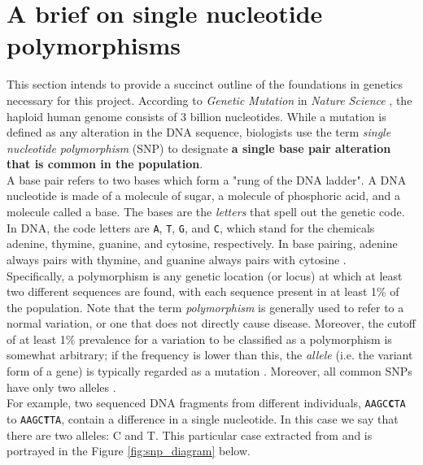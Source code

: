 \documentclass[a4paper, 11pt]{article}
\theoremstyle{definition}
\theoremstyle{remark}
\begin{document}
\section{A brief on single nucleotide polymorphisms}

This section intends to provide a succinct outline of the foundations in genetics necessary for this project. According to \textit{Genetic Mutation} in \textit{Nature Science} \cite{NatureGeneticMutation}, the haploid human genome consists of 3 billion nucleotides. While a mutation is defined as any alteration in the DNA sequence, biologists use the term \textit{single nucleotide polymorphism} (SNP) to designate \textbf{a single base pair alteration that is common in the population}.\\ 

A base pair refers to two bases which form a "rung of the DNA ladder". A DNA nucleotide is made of a molecule of sugar, a molecule of phosphoric acid, and a molecule called a base. The bases are the \textit{letters} that spell out the genetic code. In DNA, the code letters are \texttt{A}, \texttt{T}, \texttt{G}, and \texttt{C}, which stand for the chemicals adenine, thymine, guanine, and cytosine, respectively. In base pairing, adenine always pairs with thymine, and guanine always pairs with cytosine \cite{GeneticsReview}.\\


Specifically, a polymorphism is any genetic location (or locus) at which at least two different sequences are found, with each sequence present in at least 1\% of the population. Note that the term \textit{polymorphism} is generally used to refer to a normal variation, or one that does not directly cause disease. Moreover, the cutoff of at least 1\% prevalence for a variation to be classified as a polymorphism is somewhat arbitrary; if the frequency is lower than this, the \textit{allele} (i.e. the variant form of a gene) is typically regarded as a mutation \cite{MutationVSPolymorphishm}. Moreover, all common SNPs have only two alleles \cite{GeneticsWiki}.\\


For example, two sequenced DNA fragments from different individuals, \texttt{AAGC\textbf{C}TA} to \texttt{AAGC\textbf{T}TA}, contain a difference in a single nucleotide. In this case we say that there are two alleles: C and T. This particular case extracted from \cite{GeneticsWiki} and is portrayed in the Figure \ref{fig:snp_diagram} below.\\
\end{document}
